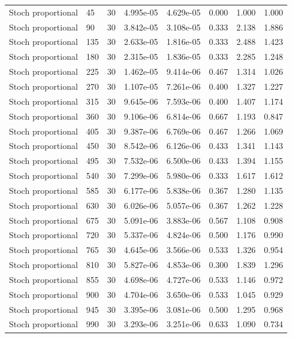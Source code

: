 \begin{scriptsize}
\begin{longtable}{llrrrrrr}
Stoch proportional & 45 & 30 & 4.995e-05 & 4.629e-05 & 0.000 & 1.000 & 1.000 \\
Stoch proportional & 90 & 30 & 3.842e-05 & 3.108e-05 & 0.333 & 2.138 & 1.886 \\
Stoch proportional & 135 & 30 & 2.633e-05 & 1.816e-05 & 0.333 & 2.488 & 1.423 \\
Stoch proportional & 180 & 30 & 2.315e-05 & 1.836e-05 & 0.333 & 2.285 & 1.248 \\
Stoch proportional & 225 & 30 & 1.462e-05 & 9.414e-06 & 0.467 & 1.314 & 1.026 \\
Stoch proportional & 270 & 30 & 1.107e-05 & 7.261e-06 & 0.400 & 1.327 & 1.227 \\
Stoch proportional & 315 & 30 & 9.645e-06 & 7.593e-06 & 0.400 & 1.407 & 1.174 \\
Stoch proportional & 360 & 30 & 9.106e-06 & 6.814e-06 & 0.667 & 1.193 & 0.847 \\
Stoch proportional & 405 & 30 & 9.387e-06 & 6.769e-06 & 0.467 & 1.266 & 1.069 \\
Stoch proportional & 450 & 30 & 8.542e-06 & 6.126e-06 & 0.433 & 1.341 & 1.143 \\
Stoch proportional & 495 & 30 & 7.532e-06 & 6.500e-06 & 0.433 & 1.394 & 1.155 \\
Stoch proportional & 540 & 30 & 7.299e-06 & 5.980e-06 & 0.333 & 1.617 & 1.612 \\
Stoch proportional & 585 & 30 & 6.177e-06 & 5.838e-06 & 0.367 & 1.280 & 1.135 \\
Stoch proportional & 630 & 30 & 6.026e-06 & 5.057e-06 & 0.367 & 1.262 & 1.228 \\
Stoch proportional & 675 & 30 & 5.091e-06 & 3.883e-06 & 0.567 & 1.108 & 0.908 \\
Stoch proportional & 720 & 30 & 5.337e-06 & 4.824e-06 & 0.500 & 1.176 & 0.990 \\
Stoch proportional & 765 & 30 & 4.645e-06 & 3.566e-06 & 0.533 & 1.326 & 0.954 \\
Stoch proportional & 810 & 30 & 5.827e-06 & 4.853e-06 & 0.300 & 1.839 & 1.296 \\
Stoch proportional & 855 & 30 & 4.698e-06 & 4.727e-06 & 0.533 & 1.146 & 0.972 \\
Stoch proportional & 900 & 30 & 4.704e-06 & 3.650e-06 & 0.533 & 1.045 & 0.929 \\
Stoch proportional & 945 & 30 & 3.395e-06 & 3.081e-06 & 0.500 & 1.295 & 0.968 \\
Stoch proportional & 990 & 30 & 3.293e-06 & 3.251e-06 & 0.633 & 1.090 & 0.734 \\

\end{longtable}
\end{scriptsize}
